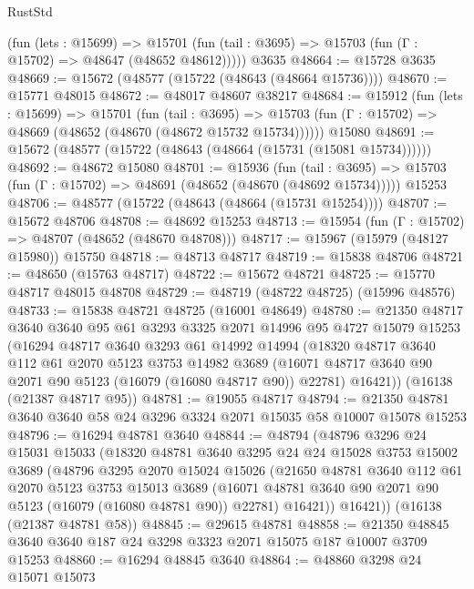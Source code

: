 \begin{lexlean}{RustStd}
\begin{coremodule}
      (fun (lets : @15699) =>
      @15701 (fun (tail : @3695) => @15703 (fun (Γ : @15702) => @48647 (@48652 @48612)))))
    @3635
@48664 := @15728 @3635
@48669 := @15672 (@48577 (@15722 (@48643 (@48664 @15736))))
@48670 := @15771 @48015
@48672 := @48017 @48607 @38217
@48684 := @15912
    (fun (lets : @15699) =>
    @15701
      (fun (tail : @3695) =>
      @15703 (fun (Γ : @15702) => @48669 (@48652 (@48670 (@48672 @15732 @15734))))))
    @15080
@48691 := @15672 (@48577 (@15722 (@48643 (@48664 (@15731 (@15081 @15734))))))
@48692 := @48672 @15080
@48701 := @15936
    (fun (tail : @3695) => @15703 (fun (Γ : @15702) => @48691 (@48652 (@48670 (@48692 @15734)))))
    @15253
@48706 := @48577 (@15722 (@48643 (@48664 (@15731 @15254))))
@48707 := @15672 @48706
@48708 := @48692 @15253
@48713 := @15954 (fun (Γ : @15702) => @48707 (@48652 (@48670 @48708)))
@48717 := @15967 (@15979 (@48127 @15980)) @15750
@48718 := @48713 @48717
@48719 := @15838 @48706
@48721 := @48650 (@15763 @48717)
@48722 := @15672 @48721
@48725 := @15770 @48717 @48015 @48708
@48729 := @48719 (@48722 @48725) (@15996 @48576)
@48733 := @15838 @48721 @48725 (@16001 @48649)
@48780 := @21350
    @48717
    @3640
    @3640
    @95
    @61
    @3293
    @3325
    @2071
    @14996
    @95
    @4727
    @15079
    @15253
    (@16294
      @48717
      @3640
      @3293
      @61
      @14992
      @14994
      (@18320
        @48717
        @3640
        @112
        @61
        @2070
        @5123
        @3753
        @14982
        @3689
        (@16071 @48717 @3640 @90 @2071 @90 @5123 (@16079 (@16080 @48717 @90)) @22781)
        @16421))
    (@16138 (@21387 @48717 @95))
@48781 := @19055 @48717
@48794 := @21350 @48781 @3640 @3640 @58 @24 @3296 @3324 @2071 @15035 @58 @10007 @15078 @15253
@48796 := @16294 @48781 @3640
@48844 := @48794
    (@48796
      @3296
      @24
      @15031
      @15033
      (@18320
        @48781
        @3640
        @3295
        @24
        @24
        @15028
        @3753
        @15002
        @3689
        (@48796
          @3295
          @2070
          @15024
          @15026
          (@21650
            @48781
            @3640
            @112
            @61
            @2070
            @5123
            @3753
            @15013
            @3689
            (@16071 @48781 @3640 @90 @2071 @90 @5123 (@16079 (@16080 @48781 @90)) @22781)
            @16421))
        @16421))
    (@16138 (@21387 @48781 @58))
@48845 := @29615 @48781
@48858 := @21350 @48845 @3640 @3640 @187 @24 @3298 @3323 @2071 @15075 @187 @10007 @3709 @15253
@48860 := @16294 @48845 @3640
@48864 := @48860 @3298 @24 @15071 @15073

\end{coremodule}
\end{lexlean}
